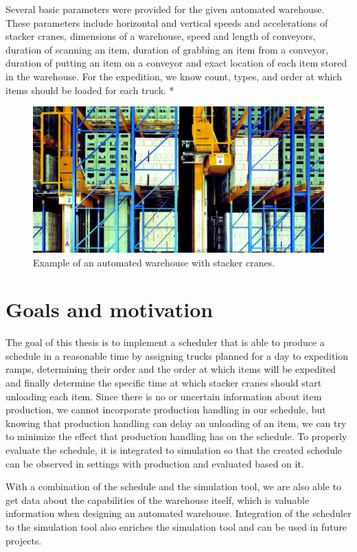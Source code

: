 \documentclass{ctuthesis}
\begin{document}
Several basic parameters were provided for the given automated warehouse. These parameters include horizontal and vertical speeds and accelerations of stacker cranes, dimensions of a warehouse, speed and length of conveyors, duration of scanning an item, duration of grabbing an item from a conveyor, duration of putting an item on a conveyor and exact location of each item stored in the warehouse. For the expedition, we know count, types, and order at which items should be loaded for each truck. 
*
\begin{figure}
\includegraphics[width=0.8\linewidth]{highbaywarehouse.jpg}
\caption{Example of an automated warehouse with stacker cranes. \cite{warehousepic}}
\label{fig:hb}
\end{figure}

\section{Goals and motivation}

The goal of this thesis is to implement a scheduler that is able to produce a schedule in a reasonable time by assigning trucks planned for a day to expedition ramps, determining their order and the order at which items will be expedited and finally determine the specific time at which stacker cranes should start unloading each item. Since there is no or uncertain information about item production, we cannot incorporate production handling in our schedule, but knowing that production handling can delay an unloading of an item, we can try to minimize the effect that production handling has on the schedule. To properly evaluate the schedule, it is integrated to simulation so that the created schedule can be observed in settings with production and evaluated based on it. 

With a combination of the schedule and the simulation tool, we are also able to get data about the capabilities of the warehouse itself, which is valuable information when designing an automated warehouse. Integration of the scheduler to the simulation tool also enriches the simulation tool and can be used in future projects.
\end{document}
